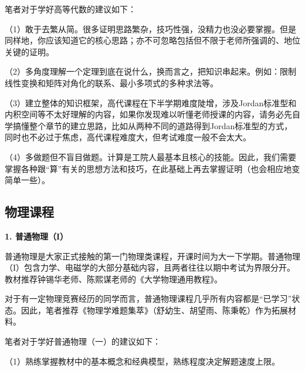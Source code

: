 \documentclass[11pt,oneside]{book}
\begin{document}
\vspace{10pt}

笔者对于学好高等代数的建议如下：

\vspace{10pt}

（1）敢于去繁从简。很多证明思路繁杂，技巧性强，没精力也没必要掌握。但是同样地，你应该知道它的核心思路；亦不可忽略包括但不限于老师所强调的、地位关键的证明。

\vspace{10pt}

（2）多角度理解一个定理到底在说什么，换而言之，把知识串起来。例如：限制线性变换和矩阵对角化的联系、最小多项式的多种求法等。

\vspace{10pt}

（3）建立整体的知识框架，高代课程在下半学期难度陡增，涉及Jordan标准型和内积空间等不太好理解的内容，如果你发现难以听懂老师授课的内容，请务必先自学搞懂整个章节的建立思路，比如从两种不同的道路得到Jordan标准型的方式，同时也不必过于焦虑，高代课程难度大，但考试难度一般不会太大。

\vspace{10pt}

（4）多做题但不盲目做题。计算是工院人最基本且核心的技能。因此，我们需要掌握各种跟“算”有关的思想方法和技巧，在此基础上再去掌握证明（也会相应地变简单一些）。

\vspace{10pt}

\subsection{物理课程}
\textbf{1. 普通物理（I）}

普通物理是大家正式接触的第一门物理类课程，开课时间为大一下学期。普通物理（I）包含力学、电磁学的大部分基础内容，且两者往往以期中考试为界限分开。教材推荐钟锡华老师、陈熙谋老师的《大学物理通用教程》。

\vspace{10pt}

对于有一定物理竞赛经历的同学而言，普通物理课程几乎所有内容都是“已学习”状态。因此，笔者推荐《物理学难题集萃》（舒幼生、胡望雨、陈秉乾）作为拓展材料。

\vspace{10pt}

笔者对于学好普通物理（一）的建议如下：

\vspace{10pt}

（1）熟练掌握教材中的基本概念和经典模型，熟练程度决定解题速度上限。
\end{document}
